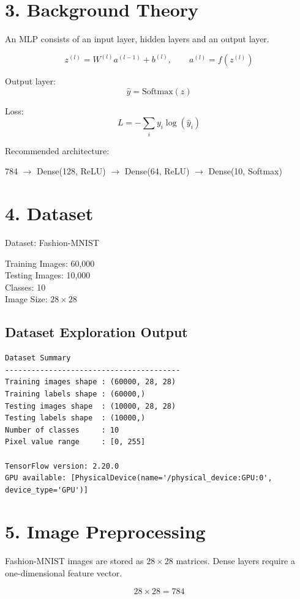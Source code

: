 \documentclass[11pt]{article}
\begin{document}
\section*{3. Background Theory}
An MLP consists of an input layer, hidden layers and an output layer.

\[
z^{(l)}=W^{(l)}a^{(l-1)}+b^{(l)},\qquad
a^{(l)}=f(z^{(l)})
\]

Output layer:
\[
\hat y=\mathrm{Softmax}(z)
\]

Loss:
\[
L=-\sum_i y_i\log(\hat y_i)
\]

Recommended architecture:

\begin{center}
784 $\rightarrow$ Dense(128, ReLU) $\rightarrow$ Dense(64, ReLU) $\rightarrow$ Dense(10, Softmax)
\end{center}

\section*{4. Dataset}
Dataset: Fashion-MNIST

Training Images: 60,000 \\
Testing Images: 10,000 \\
Classes: 10 \\
Image Size: $28\times28$

\subsection*{Dataset Exploration Output}
\begin{lstlisting}[style=output]
Dataset Summary
----------------------------------------
Training images shape : (60000, 28, 28)
Training labels shape : (60000,)
Testing images shape  : (10000, 28, 28)
Testing labels shape  : (10000,)
Number of classes     : 10
Pixel value range     : [0, 255]

TensorFlow version: 2.20.0
GPU available: [PhysicalDevice(name='/physical_device:GPU:0', device_type='GPU')]
\end{lstlisting}

\section*{5. Image Preprocessing}

Fashion-MNIST images are stored as $28\times28$ matrices. Dense layers require a one-dimensional feature vector.

\[
28\times28=784
\]
\end{document}
